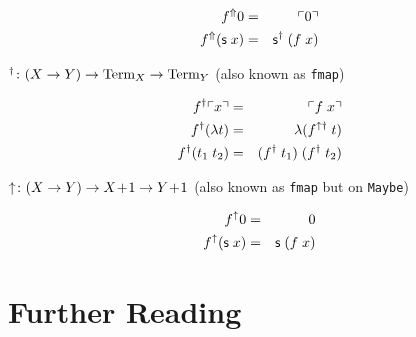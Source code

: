 \begin{eqnarray*}
  f^\Uparrow 0 & = & \ulcorner 0 \urcorner \\
  f^\Uparrow (\mathsf{s} \; x) & = & \mathsf{s}^\dagger\;(f\;x) \\
\end{eqnarray*}

$^\dagger \colon (X \to Y) \to \mathrm{Term}_{X} \to \mathrm{Term}_{Y}$ (also known as \texttt{fmap})

\begin{eqnarray*}
  f^\dagger\ulcorner x \urcorner   & = & \ulcorner f\;x \urcorner \\
  f^\dagger(\lambda t) & = & \lambda(f^{\uparrow\dagger}\;t) \\
  f^\dagger(t_1\;t_2)  & = & (f^\dagger\;t_1)\;(f^\dagger\;t_2)
\end{eqnarray*}

$\uparrow \colon (X \to Y) \to X\!+\!1 \to Y\!+\!1$
  (also known as \texttt{fmap} but on \texttt{Maybe})

\begin{eqnarray*}
  f^\uparrow 0            & = & 0 \\
  f^\uparrow (\mathsf{s}\;x) & = & \mathsf{s}\;(f \; x)
\end{eqnarray*}

\section{Further Reading}
